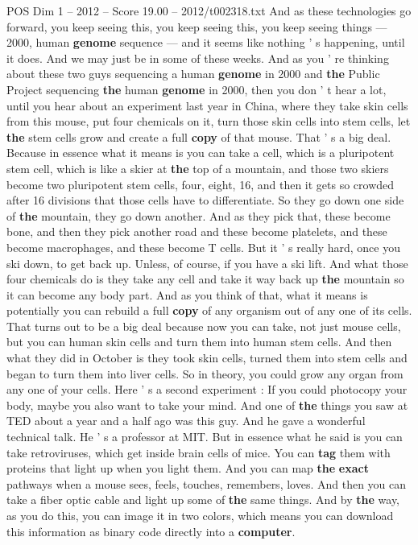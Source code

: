 \begin{textsample}{POS Dim 1 – 2012 – Score 19.00 – 2012/t002318.txt}
And as these technologies go forward, you keep seeing this, you keep seeing this, you keep seeing things — 2000, human \textbf{genome} sequence — and it seems like nothing ' s happening, until it does.
And we may just be in some of these weeks.
And as you ' re thinking about these two guys sequencing a human \textbf{genome} in 2000 and \textbf{the} Public Project sequencing \textbf{the} human \textbf{genome} in 2000, then you don ' t hear a lot, until you hear about an experiment last year in China, where they take skin cells from this mouse, put four chemicals on it, turn those skin cells into stem cells, let \textbf{the} stem cells grow and create a full \textbf{copy} of that mouse.
That ' s a big deal.
Because in essence what it means is you can take a cell, which is a pluripotent stem cell, which is like a skier at \textbf{the} top of a mountain, and those two skiers become two pluripotent stem cells, four, eight, 16, and then it gets so crowded after 16 divisions that those cells have to differentiate.
So they go down one side of \textbf{the} mountain, they go down another.
And as they pick that, these become bone, and then they pick another road and these become platelets, and these become macrophages, and these become T cells.
But it ' s really hard, once you ski down, to get back up.
Unless, of course, if you have a ski lift.
And what those four chemicals do is they take any cell and take it way back up \textbf{the} mountain so it can become any body part.
And as you think of that, what it means is potentially you can rebuild a full \textbf{copy} of any organism out of any one of its cells.
That turns out to be a big deal because now you can take, not just mouse cells, but you can human skin cells and turn them into human stem cells.
And then what they did in October is they took skin cells, turned them into stem cells and began to turn them into liver cells.
So in theory, you could grow any organ from any one of your cells.
Here ' s a second experiment : If you could photocopy your body, maybe you also want to take your mind.
And one of \textbf{the} things you saw at TED about a year and a half ago was this guy.
And he gave a wonderful technical talk.
He ' s a professor at MIT.
But in essence what he said is you can take retroviruses, which get inside brain cells of mice.
You can \textbf{tag} them with proteins that light up when you light them.
And you can map \textbf{the} \textbf{exact} pathways when a mouse sees, feels, touches, remembers, loves.
And then you can take a fiber optic cable and light up some of \textbf{the} same things.
And by \textbf{the} way, as you do this, you can image it in two colors, which means you can download this information as binary code directly into a \textbf{computer}.

\end{textsample}
